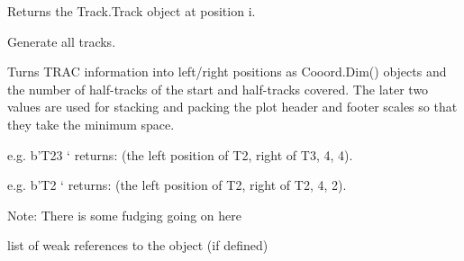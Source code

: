 \documentclass[letterpaper,10pt,english]{sphinxmanual}
\begin{document}
\begin{fulllineitems}
\begin{fulllineitems}
\end{fulllineitems}


\begin{fulllineitems}
\label{\detokenize{ref/util/plot/FILMCfg:TotalDepth.util.plot.FILMCfg.PhysFilmCfg.__getitem__}}
Returns the Track.Track object at position i.

\end{fulllineitems}


\begin{fulllineitems}
\label{\detokenize{ref/util/plot/FILMCfg:TotalDepth.util.plot.FILMCfg.PhysFilmCfg.genTracks}}
Generate all tracks.

\end{fulllineitems}


\begin{fulllineitems}
\label{\detokenize{ref/util/plot/FILMCfg:TotalDepth.util.plot.FILMCfg.PhysFilmCfg.interpretTrac}}
Turns TRAC information into left/right positions as Cooord.Dim()
objects and the number of half-tracks of the start and half-tracks
covered. The later two values are used for stacking and packing the
plot header and footer scales so that they take the minimum space.

e.g. b’T23 ‘ returns:
(the left position of T2, right of T3, 4, 4).

e.g. b’T2 ‘ returns:
(the left position of T2, right of T2, 4, 2).

Note: There is some fudging going on here

\end{fulllineitems}


\begin{fulllineitems}
\label{\detokenize{ref/util/plot/FILMCfg:TotalDepth.util.plot.FILMCfg.PhysFilmCfg.__weakref__}}
list of weak references to the object (if defined)

\end{fulllineitems}


\end{fulllineitems}
\end{document}
